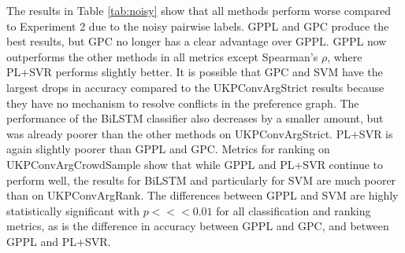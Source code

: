 The results in Table \ref{tab:noisy} show that all methods perform worse compared to Experiment 2
due to the noisy pairwise labels. 
GPPL and GPC produce the best results, but GPC no longer has a clear advantage over GPPL. 
GPPL now outperforms the other methods in all metrics except Spearman's $\rho$, where PL+SVR performs slightly better. 
It is possible that GPC and SVM have the
largest drops in accuracy compared to the UKPConvArgStrict results because they 
have no mechanism to resolve conflicts in the preference graph. 
The performance of the BiLSTM classifier also 
decreases by a smaller amount, but was already poorer than the other methods on UKPConvArgStrict. 
PL+SVR is again slightly poorer than GPPL and GPC.
Metrics for ranking on UKPConvArgCrowdSample show that while GPPL and PL+SVR continue to perform well, the 
results for BiLSTM and particularly for SVM are much poorer than on UKPConvArgRank. The
differences between GPPL and SVM are highly statistically significant with $p<<<0.01$ for all classification and ranking metrics, as is the difference in accuracy between GPPL and GPC, and between GPPL and PL+SVR.

% 
% 
% 

